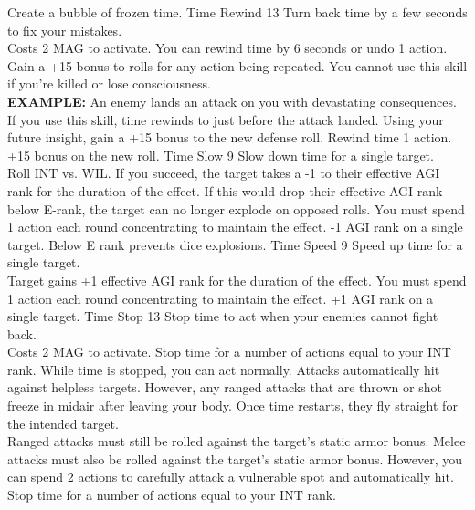\begin{path}
{Create a bubble of frozen time.}
\skilldescription
{Time Rewind}
{13}
{Turn back time by a few seconds to fix your mistakes.
\\Costs 2 MAG to activate. You can rewind time by 6 seconds or undo 1 action. Gain a +15 bonus to rolls for any action being repeated. You cannot use this skill if you're killed or lose consciousness.
\\\textbf{EXAMPLE:} An enemy lands an attack on you with devastating consequences. If you use this skill, time rewinds to just before the attack landed. Using your future insight, gain a +15 bonus to the new defense roll.}
{Rewind time 1 action. +15 bonus on the new roll.}
\skilldescription
{Time Slow}
{9}
{Slow down time for a single target.
\\Roll INT vs. WIL. If you succeed, the target takes a -1 to their effective AGI rank for the duration of the effect. If this would drop their effective AGI rank below E-rank, the target can no longer explode on opposed rolls. You must spend 1 action each round concentrating to maintain the effect.}
{-1 AGI rank on a single target. Below E rank prevents dice explosions.}
\skilldescription
{Time Speed}
{9}
{Speed up time for a single target.
\\Target gains +1 effective AGI rank for the duration of the effect. You must spend 1 action each round concentrating to maintain the effect.}
{+1 AGI rank on a single target.}
\skilldescription
{Time Stop}
{13}
{Stop time to act when your enemies cannot fight back.
\\Costs 2 MAG to activate. Stop time for a number of actions equal to your INT rank. While time is stopped, you can act normally. Attacks automatically hit against helpless targets. However, any ranged attacks that are thrown or shot freeze in midair after leaving your body. Once time restarts, they fly straight for the intended target.
\\Ranged attacks must still be rolled against the target's static armor bonus. Melee attacks must also be rolled against the target's static armor bonus. However, you can spend 2 actions to carefully attack a vulnerable spot and automatically hit.}
{Stop time for a number of actions equal to your INT rank.}

\end{path}
